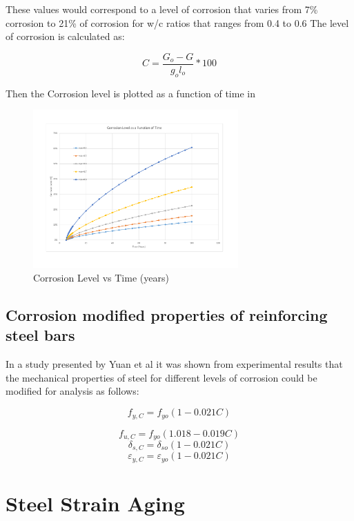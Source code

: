 These values would correspond to a level of corrosion that varies from 7\% corrosion to 21\% of corrosion for w/c ratios that ranges from 0.4 to 0.6
The level of corrosion is calculated as:

\begin{equation}
  C=\frac{G_o-G}{g_ol_o} *100%
  \label{eq.seven}
\end{equation} 

Then the Corrosion level is plotted as a function of time in 

\begin{figure}[htbp]
\centering
\includegraphics[width=0.7\textwidth]{Chapter-1/figs/CorrosionLevel}
\caption{Corrosion Level vs Time (years)}
\label{fig:hist3}
\end{figure}

\subsection{Corrosion modified properties of reinforcing steel bars}

In a study presented by Yuan et al \cite{Yuan2000} it was shown from experimental results that the mechanical properties of steel for different levels of corrosion could be modified for analysis as follows:

\begin{equation}
  f_{y,C}=f_{yo}(1-0.021C)
  \label{eq.eight}
\end{equation} 

\[
  f_{u,C}=f_{yo}(1.018-0.019C)
\]
\[
  \delta_{s,C}=\delta_{so}(1-0.021C)
\]
\[
  \varepsilon_{y,C}=\varepsilon_{yo}(1-0.021C)
\]

\section{Steel Strain Aging}

